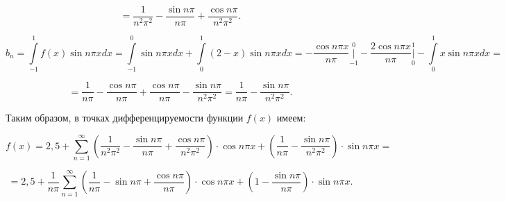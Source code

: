 \documentclass{article}
\begin{document}
$$=\frac{1}{n^2\pi^2}-\frac{\sin{n\pi}}{n\pi}+\frac{\cos{n\pi}}{n^2\pi^2}.$$

$$b_n=\int\limits_{-1}^{1}f(x)\sin{n\pi x}dx=\int\limits_{-1}^{0}\sin{n\pi x}dx+\int\limits_{0}^{1}(2-x)\sin{n\pi x}dx=-\frac{\cos{n\pi x}}{n\pi}\bigg|\limits_{-1}^{0}-\frac{2\cos{n\pi x}}{n\pi}\bigg|\limits_{0}^{1}-\int\limits_{0}^{1}x\sin{n\pi x}dx=$$

$$=\frac{1}{n\pi}-\frac{\cos{n\pi}}{n\pi}+\frac{\cos{n\pi}}{n\pi}-\frac{\sin{n\pi}}{n^2\pi^2}=\frac{1}{n\pi}-\frac{\sin{n\pi}}{n^2\pi^2}.$$

Таким образом, в точках дифференцируемости функции $f(x)$ имеем:

$$f(x)=2,5+\sum\limits_{n=1}^{\infty}\left(\frac{1}{n^2\pi^2}-\frac{\sin{n\pi}}{n\pi}+\frac{\cos{n\pi}}{n^2\pi^2}\right)\cdot\cos{n\pi x}+\left(\frac{1}{n\pi}-\frac{\sin{n\pi}}{n^2\pi^2}\right)\cdot\sin{n\pi x}=$$

$$=2,5+\frac{1}{n\pi}\sum\limits_{n=1}^{\infty}\left(\frac{1}{n\pi}-\sin{n\pi}+\frac{\cos{n\pi}}{n\pi}\right)\cdot\cos{n\pi x}+\left(1-\frac{\sin{n\pi}}{n\pi}\right)\cdot\sin{n\pi x}.$$
\end{document}

